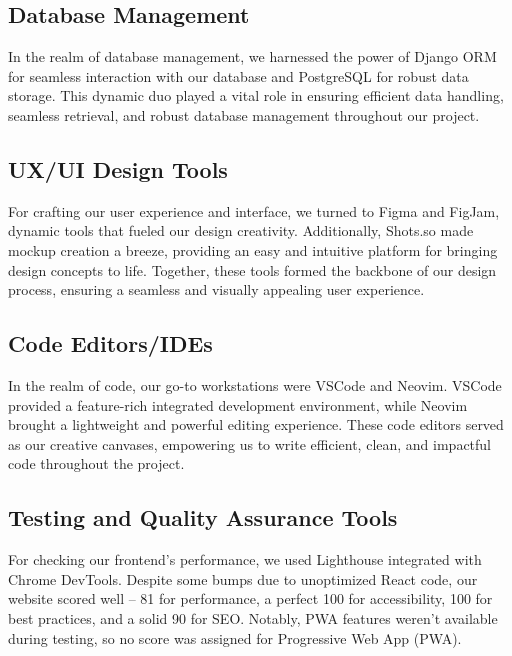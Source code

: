 \documentclass[12pt,a4paper]{article}
\begin{document}
\begin{spacing}{1.5}
    \subsection{Database Management}
    In the realm of database management, we harnessed the power of Django ORM for
    seamless interaction with our database and PostgreSQL for robust data storage.
    This dynamic duo played a vital role in ensuring efficient data handling,
    seamless retrieval, and robust database management throughout our project.

    \subsection{UX/UI Design Tools}
    For crafting our user experience and interface, we turned to Figma and FigJam,
    dynamic tools that fueled our design creativity. Additionally, Shots.so made
    mockup creation a breeze, providing an easy and intuitive platform for bringing
    design concepts to life. Together, these tools formed the backbone of our
    design process, ensuring a seamless and visually appealing user experience.

    \subsection{Code Editors/IDEs}
    In the realm of code, our go-to workstations were VSCode and Neovim. VSCode
    provided a feature-rich integrated development environment, while Neovim
    brought a lightweight and powerful editing experience. These code editors
    served as our creative canvases, empowering us to write efficient, clean, and
    impactful code throughout the project.

    \subsection{Testing and Quality Assurance Tools}
    For checking our frontend's performance, we used Lighthouse integrated with
    Chrome DevTools. Despite some bumps due to unoptimized React code, our website
    scored well – 81 for performance, a perfect 100 for accessibility, 100 for best
    practices, and a solid 90 for SEO. Notably, PWA features weren't available
    during testing, so no score was assigned for Progressive Web App (PWA).


\end{spacing}
\end{document}
